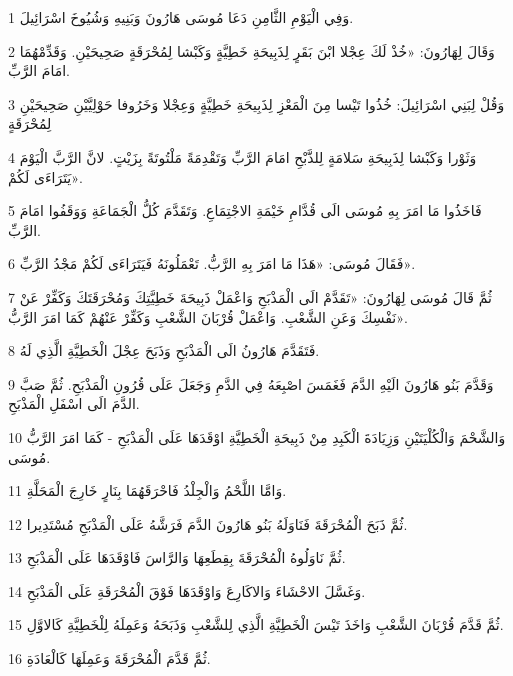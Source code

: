 \par 1 وَفِي الْيَوْمِ الثَّامِنِ دَعَا مُوسَى هَارُونَ وَبَنِيهِ وَشُيُوخَ اسْرَائِيلَ.
\par 2 وَقَالَ لِهَارُونَ: «خُذْ لَكَ عِجْلا ابْنَ بَقَرٍ لِذَبِيحَةِ خَطِيَّةٍ وَكَبْشا لِمُحْرَقَةٍ صَحِيحَيْنِ. وَقَدِّمْهُمَا امَامَ الرَّبِّ.
\par 3 وَقُلْ لِبَنِي اسْرَائِيلَ: خُذُوا تَيْسا مِنَ الْمَعْزِ لِذَبِيحَةِ خَطِيَّةٍ وَعِجْلا وَخَرُوفا حَوْلِيَّيْنِ صَحِيحَيْنِ لِمُحْرَقَةٍ
\par 4 وَثَوْرا وَكَبْشا لِذَبِيحَةِ سَلامَةٍ لِلذَّبْحِ امَامَ الرَّبِّ وَتَقْدِمَةً مَلْتُوتَةً بِزَيْتٍ. لانَّ الرَّبَّ الْيَوْمَ يَتَرَاءَى لَكُمْ».
\par 5 فَاخَذُوا مَا امَرَ بِهِ مُوسَى الَى قُدَّامِ خَيْمَةِ الاجْتِمَاعِ. وَتَقَدَّمَ كُلُّ الْجَمَاعَةِ وَوَقَفُوا امَامَ الرَّبِّ.
\par 6 فَقَالَ مُوسَى: «هَذَا مَا امَرَ بِهِ الرَّبُّ. تَعْمَلُونَهُ فَيَتَرَاءَى لَكُمْ مَجْدُ الرَّبِّ».
\par 7 ثُمَّ قَالَ مُوسَى لِهَارُونَ: «تَقَدَّمْ الَى الْمَذْبَحِ وَاعْمَلْ ذَبِيحَةَ خَطِيَّتِكَ وَمُحْرَقَتَكَ وَكَفِّرْ عَنْ نَفْسِكَ وَعَنِ الشَّعْبِ. وَاعْمَلْ قُرْبَانَ الشَّعْبِ وَكَفِّرْ عَنْهُمْ كَمَا امَرَ الرَّبُّ».
\par 8 فَتَقَدَّمَ هَارُونُ الَى الْمَذْبَحِ وَذَبَحَ عِجْلَ الْخَطِيَّةِ الَّذِي لَهُ.
\par 9 وَقَدَّمَ بَنُو هَارُونَ الَيْهِ الدَّمَ فَغَمَسَ اصْبِعَهُ فِي الدَّمِ وَجَعَلَ عَلَى قُرُونِ الْمَذْبَحِ. ثُمَّ صَبَّ الدَّمَ الَى اسْفَلِ الْمَذْبَحِ.
\par 10 وَالشَّحْمَ وَالْكُلْيَتَيْنِ وَزِيَادَةَ الْكَبِدِ مِنْ ذَبِيحَةِ الْخَطِيَّةِ اوْقَدَهَا عَلَى الْمَذْبَحِ - كَمَا امَرَ الرَّبُّ مُوسَى.
\par 11 وَامَّا اللَّحْمُ وَالْجِلْدُ فَاحْرَقَهُمَا بِنَارٍ خَارِجَ الْمَحَلَّةِ.
\par 12 ثُمَّ ذَبَحَ الْمُحْرَقَةَ فَنَاوَلَهُ بَنُو هَارُونَ الدَّمَ فَرَشَّهُ عَلَى الْمَذْبَحِ مُسْتَدِيرا.
\par 13 ثُمَّ نَاوَلُوهُ الْمُحْرَقَةَ بِقِطَعِهَا وَالرَّاسَ فَاوْقَدَهَا عَلَى الْمَذْبَحِ.
\par 14 وَغَسَّلَ الاحْشَاءَ وَالاكَارِعَ وَاوْقَدَهَا فَوْقَ الْمُحْرَقَةِ عَلَى الْمَذْبَحِ.
\par 15 ثُمَّ قَدَّمَ قُرْبَانَ الشَّعْبِ وَاخَذَ تَيْسَ الْخَطِيَّةِ الَّذِي لِلشَّعْبِ وَذَبَحَهُ وَعَمِلَهُ لِلْخَطِيَّةِ كَالاوَّلِ.
\par 16 ثُمَّ قَدَّمَ الْمُحْرَقَةَ وَعَمِلَهَا كَالْعَادَةِ.

